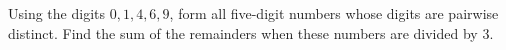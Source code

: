 Using the digits $0,1,4,6,9$, form all five-digit numbers whose digits are pairwise distinct. Find the sum of the remainders when these numbers are divided by $3$.
